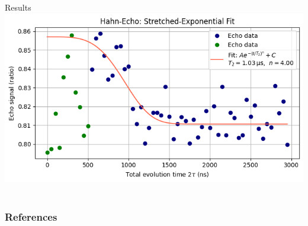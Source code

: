 \documentclass{beamer}
\begin{document}
\begin{frame}{Results}
    \centering
    \includegraphics[width=\linewidth]{presentation/figs/hahn.png}\


\end{frame}



\begin{frame}[allowframebreaks] %
\frametitle{References}
\end{frame}

\end{document}
